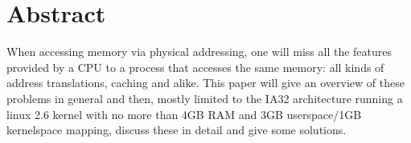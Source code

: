 %
%

\section{Abstract}

When accessing memory via physical addressing, one will miss all the features
provided by a CPU to a process that accesses the same memory: all kinds of
address translations, caching and alike. This paper will give an overview
of these problems in general and then, mostly limited to the IA32 architecture
running a linux 2.6 kernel with no more than 4GB RAM and
3GB userspace/1GB kernelspace mapping, discuss these in detail and give some
solutions.





